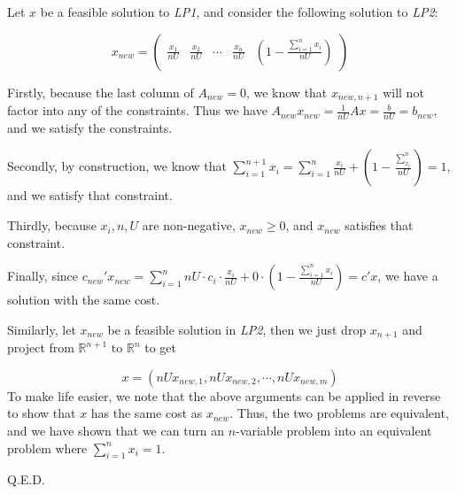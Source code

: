 Let $x$ be a feasible solution to \textit{LP1}, and consider the following solution to \textit{LP2}:

\[x_{new} = \begin{pmatrix}\frac{x_1}{nU} & \frac{x_2}{nU} & \cdots & \frac{x_n}{nU} & (1 - \frac{\sum_{i=1}^{n}x_i}{nU})\end{pmatrix}\]

Firstly, because the last column of $A_{new}=0$, we know that $x_{new, n+1}$ will not factor into any of the constraints. Thus we have $A_{new}x_{new}=\frac{1}{nU}Ax=\frac{b}{nU}=b_{new}$, and we satisfy the constraints.

Secondly, by construction, we know that $\sum_{i=1}^{n+1}x_i=\sum_{i=1}^{n}\frac{x_i}{nU}+(1 - \frac{\sum_{x_i}^{n}}{nU})=1$, and we satisfy that constraint.

Thirdly, because $x_i, n, U$ are non-negative, $x_{new}\geq 0$, and $x_{new}$ satisfies that constraint.

Finally, since $c_{new}'x_{new}=\sum_{i=1}^n nU\cdot c_i\cdot \frac{x_i}{nU} + 0\cdot (1 - \frac{\sum_{i=1}^{n}x_i}{nU})=c'x$, we have a solution with the same cost.


Similarly, let $x_{new}$ be a feasible solution in \textit{LP2}, then we just drop $x_{n+1}$ and project from $\mathbb{R}^{n+1} \text{ to } \mathbb{R}^n$ to get

\[ x = (nUx_{new,1}, nUx_{new, 2}, \cdots, nUx_{new, m})\]
To make life easier, we note that the above arguments can be applied in reverse to show that $x$ has the same cost as $x_{new}$. Thus, the two problems are equivalent, and we have shown that we can turn an $n$-variable problem into an equivalent problem where $\sum_{i=1}^{n}x_i=1$.

Q.E.D.
